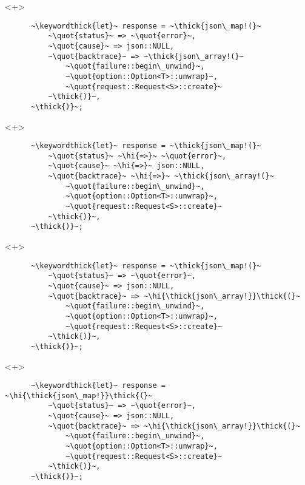 \documentclass[usepdftitle=false]{beamer}
\newcommand{\thick}[1]{\contourlength{0.16pt}\contour[10]{black}{#1}}
\newcommand{\slantbox}[2][.5]
  {%
    \mbox
      {%
        \sbox{\foobox}{#2}%
        \hskip\wd\foobox
        \pdfsave
        \pdfsetmatrix{1 0 #1 1}%
        \llap{\usebox{\foobox}}%
        \pdfrestore
      }%
  }
\newcommand{\backslantbox}[2][.5]
  {%
    \mbox
      {%
        \sbox{\foobox}{#2}%
        \hskip\wd\foobox
        \pdfsave
        \pdfsetmatrix{-1 0 #1 1}%
        \llap{\usebox{\foobox}}%
        \pdfrestore
      }%
  }
\newcommand{\hi}[1]{%
\tikz[baseline=(A.base)]
 \node[highlighting=yellowbg,inner sep=0pt,text depth=0pt] (A) {#1};%
}
\newcommand{\openquote}{\backslantbox[.2]{\hspace{11pt}''\hspace{-11pt}}}
\newcommand{\closequote}{\slantbox[-.2]{\hspace{2pt}''\hspace{-2pt}}}
\newcommand{\blackquote}[1]{\openquote#1\closequote}
\newcommand{\quot}[1]{{\color{redish}\blackquote{#1}}}
\newcommand{\keywordthick}[1]{\color{greenish}\contourlength{0.20pt}\contour[10]{greenish}{#1}}
\begin{document}
\begin{frame}[fragile]
  \begin{onlyenv}<+>
    \begin{verbatim}
      ~\keywordthick{let}~ response = ~\thick{json\_map!(}~
          ~\quot{status}~ => ~\quot{error}~,
          ~\quot{cause}~ => json::NULL,
          ~\quot{backtrace}~ => ~\thick{json\_array!(}~
              ~\quot{failure::begin\_unwind}~,
              ~\quot{option::Option<T>::unwrap}~,
              ~\quot{request::Request<S>::create}~
          ~\thick{)}~,
      ~\thick{)}~;
    \end{verbatim}
  \end{onlyenv}
  \begin{onlyenv}<+>
    \begin{verbatim}
      ~\keywordthick{let}~ response = ~\thick{json\_map!(}~
          ~\quot{status}~ ~\hi{=>}~ ~\quot{error}~,
          ~\quot{cause}~ ~\hi{=>}~ json::NULL,
          ~\quot{backtrace}~ ~\hi{=>}~ ~\thick{json\_array!(}~
              ~\quot{failure::begin\_unwind}~,
              ~\quot{option::Option<T>::unwrap}~,
              ~\quot{request::Request<S>::create}~
          ~\thick{)}~,
      ~\thick{)}~;
    \end{verbatim}
  \end{onlyenv}
  \begin{onlyenv}<+>
    \begin{verbatim}
      ~\keywordthick{let}~ response = ~\thick{json\_map!(}~
          ~\quot{status}~ => ~\quot{error}~,
          ~\quot{cause}~ => json::NULL,
          ~\quot{backtrace}~ => ~\hi{\thick{json\_array!}}\thick{(}~
              ~\quot{failure::begin\_unwind}~,
              ~\quot{option::Option<T>::unwrap}~,
              ~\quot{request::Request<S>::create}~
          ~\thick{)}~,
      ~\thick{)}~;
    \end{verbatim}
  \end{onlyenv}
  \begin{onlyenv}<+>
    \begin{verbatim}
      ~\keywordthick{let}~ response = ~\hi{\thick{json\_map!}}\thick{(}~
          ~\quot{status}~ => ~\quot{error}~,
          ~\quot{cause}~ => json::NULL,
          ~\quot{backtrace}~ => ~\hi{\thick{json\_array!}}\thick{(}~
              ~\quot{failure::begin\_unwind}~,
              ~\quot{option::Option<T>::unwrap}~,
              ~\quot{request::Request<S>::create}~
          ~\thick{)}~,
      ~\thick{)}~;
    \end{verbatim}
  \end{onlyenv}

\end{frame}
\end{document}
